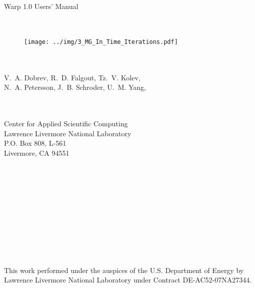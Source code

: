 \documentclass[twoside]{article}
\begin{document}
\hypersetup{pageanchor=false}
\begin{titlepage}

\begin{center}
\huge 
~\\~\\~\\~\\~\\
Warp 1.0 Users' Manual\\
~\\~\\
\end{center}

\begin{figure}[!ht]
    \centering 
    \texttt{[image: ../img/3\_MG\_In\_Time\_Iterations.pdf]}
\end{figure}

\begin{center}
~\\~\\
\Large
V.~A. Dobrev, R.~D. Falgout, Tz.~V. Kolev, \\
N.~A. Petersson, J.~B. Schroder, U.~M. Yang, \\
~\\~\\
\end{center}

\begin{center}
Center for Applied Scientific Computing \\
Lawrence Livermore National Laboratory \\
P.O. Box 808, L-561 \\
Livermore, CA 94551 \\
~\\~\\ ~\\~\\~\\~\\~\\~\\~\\~\\~\\
This work performed under the auspices of the U.S. Department of Energy by
Lawrence Livermore National Laboratory under Contract DE-AC52-07NA27344.
\end{center}


\end{titlepage}
\tableofcontents
{}
\hypersetup{pageanchor=true}

\end{document}
